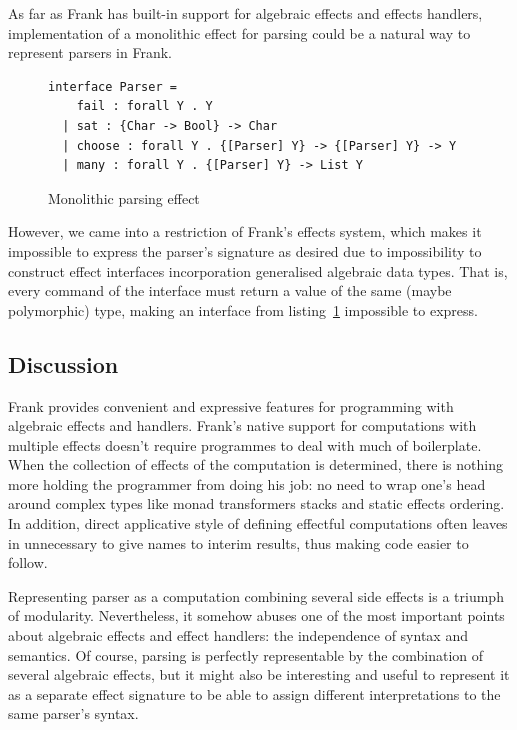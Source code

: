     As far as Frank has built-in support for algebraic effects and effects handlers,
    implementation of a monolithic effect for parsing could be a natural way to
    represent parsers in Frank.

    \begin{figure}[h]
    \begin{lstlisting}
interface Parser =
    fail : forall Y . Y
  | sat : {Char -> Bool} -> Char
  | choose : forall Y . {[Parser] Y} -> {[Parser] Y} -> Y
  | many : forall Y . {[Parser] Y} -> List Y
    \end{lstlisting}
    \caption{Monolithic parsing effect}
    \label{listing:parserEffMono}
    \end{figure}

    However, we came into a restriction of Frank's
    effects system, which makes it impossible to express the parser's signature
    as desired due to impossibility to construct effect interfaces incorporation
    generalised algebraic data types. That is, every command of the interface must
    return a value of the same (maybe polymorphic) type, making an interface from
    listing~\ref{listing:parserEffMono} impossible to express.

   \subsection{Discussion}

    Frank provides convenient and expressive features for programming with
    algebraic effects and handlers. Frank's native support for computations with
    multiple effects doesn't require programmes to deal with much of boilerplate.
    When the collection of effects of the computation is determined, there is nothing
    more holding the programmer from doing his job: no need to wrap one's head around
    complex types like monad transformers stacks and static effects ordering.
    In addition, direct applicative style of defining effectful computations often
    leaves in unnecessary to give names to interim results, thus making code
    easier to follow.

    Representing parser as a computation combining several side effects is a
    triumph of modularity. Nevertheless, it somehow abuses one of the most important
    points about algebraic effects and effect handlers: the independence of
    syntax and semantics. Of course, parsing is perfectly representable by the
    combination of several algebraic effects, but it might also be interesting
    and useful to represent it as a separate effect signature to be able to assign
    different interpretations to the same parser's syntax.

